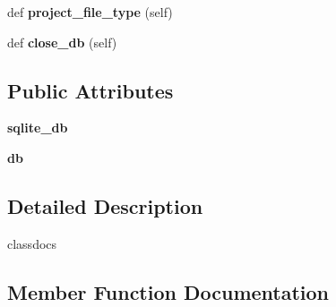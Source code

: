 \begin{DoxyCompactItemize}
\item 
def {\bfseries project\+\_\+file\+\_\+type} (self)\hypertarget{classplume-creator_1_1src_1_1plume_1_1data_1_1project_1_1_project_a67b24d4c8236fc0537cd2c611445288d}{}\label{classplume-creator_1_1src_1_1plume_1_1data_1_1project_1_1_project_a67b24d4c8236fc0537cd2c611445288d}

\item 
def {\bfseries close\+\_\+db} (self)\hypertarget{classplume-creator_1_1src_1_1plume_1_1data_1_1project_1_1_project_aeb3f08b8e9b0aeb328669bf20389c760}{}\label{classplume-creator_1_1src_1_1plume_1_1data_1_1project_1_1_project_aeb3f08b8e9b0aeb328669bf20389c760}

\end{DoxyCompactItemize}
\subsection*{Public Attributes}
\begin{DoxyCompactItemize}
\item 
{\bfseries sqlite\+\_\+db}\hypertarget{classplume-creator_1_1src_1_1plume_1_1data_1_1project_1_1_project_a902887bef9669398bd2ce261fcd45901}{}\label{classplume-creator_1_1src_1_1plume_1_1data_1_1project_1_1_project_a902887bef9669398bd2ce261fcd45901}

\item 
{\bfseries db}\hypertarget{classplume-creator_1_1src_1_1plume_1_1data_1_1project_1_1_project_a2c5d1232cca81e22f9719587cdfffe2f}{}\label{classplume-creator_1_1src_1_1plume_1_1data_1_1project_1_1_project_a2c5d1232cca81e22f9719587cdfffe2f}

\end{DoxyCompactItemize}


\subsection{Detailed Description}
classdocs 

\subsection{Member Function Documentation}
